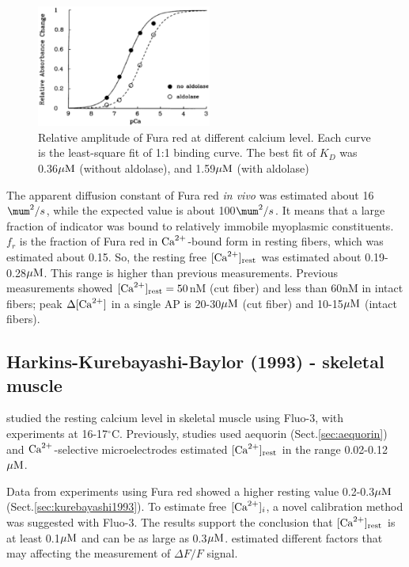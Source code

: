 \begin{figure}[hbt]
 \centerline{\includegraphics[height=4cm]{./images/Kd_Furared_kurebayashi93.eps}}
\caption{Relative amplitude of Fura red at different calcium level. Each curve
is the least-square fit of 1:1 binding curve. The best fit of $K_D$ was
0.36${\mu\text{M}}$ (without aldolase), and 1.59${\mu\text{M}}$ (with aldolase)}
\label{fig:Kd_furared_kurebayashi93}
\end{figure}

The apparent diffusion constant of Fura red {\it in vivo} was estimated about
16$\mum^2/s$, while the expected value is about 100$\mum^2/s$.  It means that a
large fraction of indicator was bound to relatively immobile myoplasmic
constituents. $f_r$ is the fraction of Fura red in ${\text{Ca}^{2+}}$-bound form in resting
fibers, which was estimated about 0.15. So, the resting free $[{\text{Ca}^{2+}}]_{\text{rest}}$ was
estimated about 0.19-0.28${\mu\text{M}}$. This range is higher than previous
measurements. Previous measurements showed $[{\text{Ca}^{2+}}]_{\text{rest}} =50$nM (cut fiber) and
less than 60nM in intact fibers; peak $\Delta [{\text{Ca}^{2+}}]$ in a single AP is
20-30${\mu\text{M}}$ (cut fiber) and 10-15${\mu\text{M}}$ (intact fibers).

\subsection{Harkins-Kurebayashi-Baylor (1993) - skeletal muscle}

\citep{harkins1993} studied the resting calcium level in skeletal muscle using
Fluo-3, with experiments at 16-17$^\circ$C. Previously, studies used aequorin
(Sect.\ref{sec:aequorin}) and ${\text{Ca}^{2+}}$-selective microelectrodes estimated $[{\text{Ca}^{2+}}]_{\text{rest}}$
in the range 0.02-0.12${\mu\text{M}}$. 

Data from experiments using Fura red showed a higher resting value 0.2-0.3${\mu\text{M}}$
\citep{kurebayashi1993} (Sect.\ref{sec:kurebayashi1993}). To estimate free
$[{\text{Ca}^{2+}}]_i$, a novel calibration method was suggested with Fluo-3.
The results support the conclusion that $[{\text{Ca}^{2+}}]_{\text{rest}}$ is at least 0.1${\mu\text{M}}$ and
can be as large as 0.3${\mu\text{M}}$. \citep{harkins1993} estimated different factors
that may affecting the measurement of $\Delta F/F$ signal.


